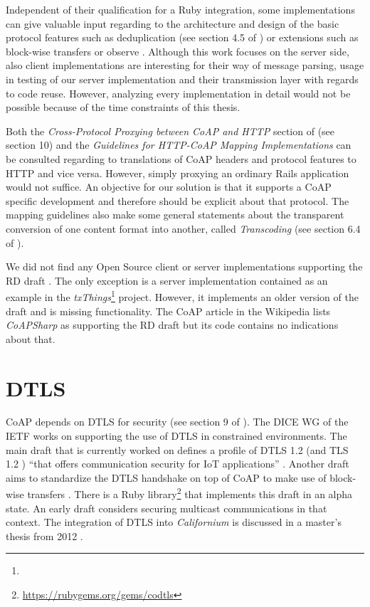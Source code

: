 	Independent of their qualification for a Ruby integration, some
	implementations can give valuable input regarding to the architecture and
	design of the basic protocol features such as deduplication (see section
	4.5 of \cite{coap}) or extensions such as block-wise transfers \cite{block}
	or observe \cite{observe}. Although this work focuses on the server side,
	also client implementations are interesting for their way of message
	parsing, usage in testing of our server implementation and their
	transmission layer with regards to code reuse. However, analyzing every
	implementation in detail would not be possible because of the time
	constraints of this thesis.

	Both the \emph{Cross-Protocol Proxying between CoAP and HTTP} section of
	\cite{coap} (see section 10) and the \emph{Guidelines for
	\ac{HTTP}-\ac{CoAP} Mapping Implementations} \cite{coap-mapping} can be
	consulted regarding to translations of \ac{CoAP} headers and protocol
	features to \ac{HTTP} and vice versa. However, simply proxying an ordinary
	Rails application would not suffice. An objective for our solution is that
	it supports a \ac{CoAP} specific development and therefore should be
	explicit about that protocol. The mapping guidelines also make some general
	statements about the transparent conversion of one content format into
	another, called \emph{Transcoding} (see section 6.4 of
	\cite{coap-mapping}).

	We did not find any Open Source client or server implementations supporting
	the \ac{RD} draft \cite{rd}. The only exception is a server implementation
	contained as an example in the \emph{txThings}\footnote{\urlTxThings}
	project. However, it implements an older version of the draft and is
	missing functionality. The \ac{CoAP} article in the Wikipedia
	\cite{coap-list-1} lists \emph{CoAPSharp} as supporting the \ac{RD} draft
	but its code contains no indications about that.

\section{\acs{DTLS}}

	\ac{CoAP} depends on \ac{DTLS} for security (see section 9 of \cite{coap}).
	The \acs{DICE} \ac{WG} of the \ac{IETF} works on supporting the use of
	\ac{DTLS} in constrained environments. The main draft that is currently
	worked on defines a profile of \ac{DTLS} 1.2 \cite{dtls} (and \ac{TLS} 1.2
	\cite{tls}) \enquote{that offers communication security for \ac{IoT}
	applications} \cite{dtls-profile}. Another draft aims to standardize the
	\ac{DTLS} handshake on top of \ac{CoAP} to make use of block-wise transfers
	\cite{codtls}. There is a Ruby
	library\footnote{\url{https://rubygems.org/gems/codtls}} that implements
	this draft in an alpha state. An early draft \cite{dtls-multicast}
	considers securing multicast communications in that context. The
	integration of \ac{DTLS} into \emph{Californium} is discussed in a master's
	thesis from 2012 \cite{californium-dtls}.
